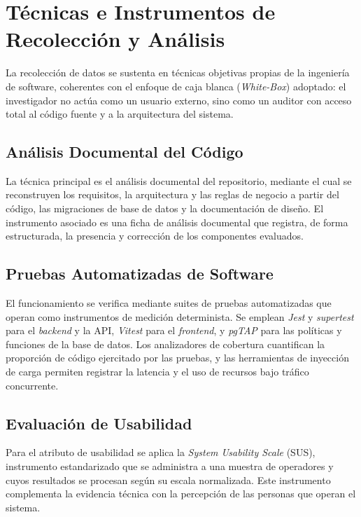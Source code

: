 \section{T\'ecnicas e Instrumentos de Recolecci\'on y An\'alisis}

La recolecci\'on de datos se sustenta en t\'ecnicas objetivas propias de la
ingenier\'ia de software, coherentes con el enfoque de caja blanca
(\textit{White-Box}) adoptado: el investigador no act\'ua como un usuario externo,
sino como un auditor con acceso total al c\'odigo fuente y a la arquitectura del
sistema.

\subsection{An\'alisis Documental del C\'odigo}

La t\'ecnica principal es el an\'alisis documental del repositorio, mediante el cual
se reconstruyen los requisitos, la arquitectura y las reglas de negocio a partir
del c\'odigo, las migraciones de base de datos y la documentaci\'on de dise\~no. El
instrumento asociado es una ficha de an\'alisis documental que registra, de forma
estructurada, la presencia y correcci\'on de los componentes evaluados.

\subsection{Pruebas Automatizadas de Software}

El funcionamiento se verifica mediante suites de pruebas automatizadas que operan
como instrumentos de medici\'on determinista. Se emplean \textit{Jest} y
\textit{supertest} para el \textit{backend} y la API, \textit{Vitest} para el
\textit{frontend}, y \textit{pgTAP} para las pol\'iticas y funciones de la base de
datos. Los analizadores de cobertura cuantifican la proporci\'on de c\'odigo
ejercitado por las pruebas, y las herramientas de inyecci\'on de carga permiten
registrar la latencia y el uso de recursos bajo tr\'afico concurrente.

\subsection{Evaluaci\'on de Usabilidad}

Para el atributo de usabilidad se aplica la \textit{System Usability Scale} (SUS),
instrumento estandarizado que se administra a una muestra de operadores y cuyos
resultados se procesan seg\'un su escala normalizada. Este instrumento complementa
la evidencia t\'ecnica con la percepci\'on de las personas que operan el sistema.
